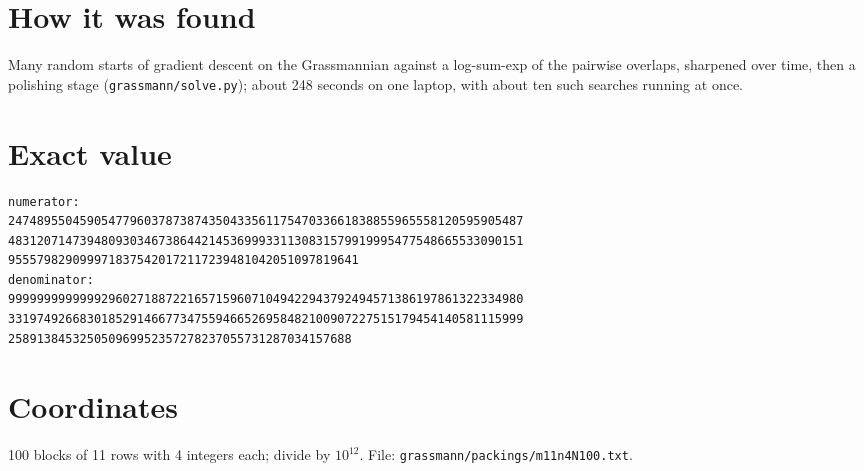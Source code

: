 \documentclass[11pt,a4paper]{article}
\begin{document}
\section{How it was found}
Many random starts of gradient descent on the Grassmannian against a log-sum-exp of the pairwise overlaps, sharpened over time, then a polishing stage (\texttt{grassmann/solve.py}); about 248 seconds on one laptop, with about ten such searches running at once.


\appendix
\section{Exact value}
{\small
\begin{verbatim}
numerator:
247489550459054779603787387435043356117547033661838855965558120595905487
483120714739480930346738644214536999331130831579919995477548665533090151
9555798290999718375420172117239481042051097819641
denominator:
999999999999929602718872216571596071049422943792494571386197861322334980
331974926683018529146677347559466526958482100907227515179454140581115999
258913845325050969952357278237055731287034157688
\end{verbatim}}

\section{Coordinates}
100 blocks of 11 rows with 4 integers each; divide by $10^{12}$. File: \texttt{grassmann/packings/m11n4N100.txt}.
{\tiny
\begin{multicols}{3}
\end{multicols}}
\end{document}
